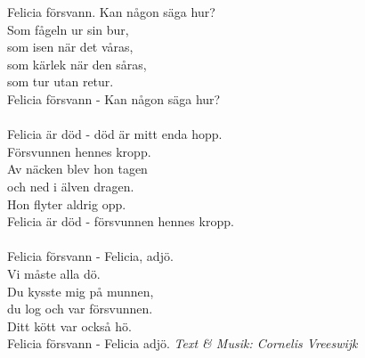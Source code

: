 \vspace{10pt}
Felicia försvann. Kan någon säga hur?\\
Som fågeln ur sin bur,\\
som isen när det våras,\\
som kärlek när den såras,\\
som tur utan retur.\\
Felicia försvann - Kan någon säga hur?\\
\\
Felicia är död - död är mitt enda hopp.\\
Försvunnen hennes kropp.\\
Av näcken blev hon tagen\\
och ned i älven dragen.\\
Hon flyter aldrig opp.\\
Felicia är död - försvunnen hennes kropp.\\
\\
Felicia försvann - Felicia, adjö.\\
Vi måste alla dö.\\
Du kysste mig på munnen,\\
du log och var försvunnen.\\
Ditt kött var också hö.\\
Felicia försvann - Felicia adjö.
\vspace{10pt}
{\footnotesize\textit{Text \& Musik: Cornelis Vreeswijk}}
